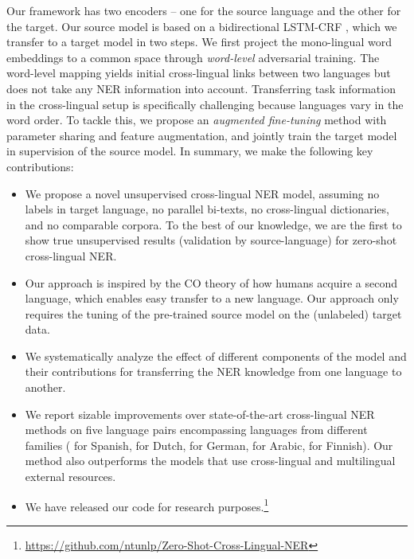 \documentclass[letterpaper]{article} \usepackage{aaai20}  \usepackage{times}  \usepackage{helvet} \usepackage{courier}  \usepackage[hyphens]{url}  \usepackage{graphicx} \urlstyle{rm} \def\UrlFont{\rm}  \usepackage{graphicx}  \frenchspacing  \setlength{\pdfpagewidth}{8.5in}  \setlength{\pdfpageheight}{11in}
\begin{document}
Our framework has two encoders -- one for the source language and the other for the target. 
Our source model is based on a bidirectional LSTM-CRF \cite{lampleNER}, which we transfer to a target model in two steps. We first project the mono-lingual word embeddings to a common space through \emph{word-level} adversarial training. The word-level mapping yields initial cross-lingual links between two languages but does not take any NER information into account. Transferring task information in the cross-lingual setup is specifically challenging because languages vary in the word order. To tackle this, we propose an \emph{augmented fine-tuning} method with parameter sharing and feature augmentation, and jointly train the target model in supervision of the source model. In summary, we make the following key contributions:
 




   

\begin{itemize}[leftmargin=*]
    
    \item We propose a novel unsupervised cross-lingual NER model, assuming no labels in target language, no parallel bi-texts, no cross-lingual dictionaries, and no comparable corpora. To the best of our knowledge, we are the first to show true unsupervised results (validation by source-language) for zero-shot cross-lingual NER.
    
    
    \item {Our approach is inspired by the CO theory of how humans acquire a second language, which enables easy transfer to a new language.} Our approach only requires the tuning of the pre-trained source model on the (unlabeled) target data. 
    
    
    \item We systematically analyze the effect of different {components of} the model and their contributions for transferring the NER knowledge from one language to another. 
    
    \item We report sizable improvements over state-of-the-art  cross-lingual NER methods on five language pairs encompassing languages from different families ( for Spanish,  for Dutch,  for German,  for Arabic,  for Finnish). Our method also outperforms the models that use cross-lingual and multilingual external resources.
    
    \item We have released our code for research purposes.\footnote{\url{https://github.com/ntunlp/Zero-Shot-Cross-Lingual-NER}} 

\end{itemize}
\end{document}
